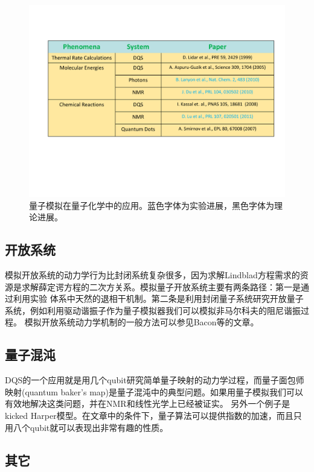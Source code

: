 \begin{figure}[htbp]
            \begin{center}
              \includegraphics[width= 0.8\columnwidth]{figures/simchem.pdf}
              \caption{量子模拟在量子化学中的应用。蓝色字体为实验进展，黑色字体为理论进展。
              }
              \label{simchem}
            \end{center}
\end{figure}

 \subsection{开放系统}

模拟开放系统的动力学行为比封闭系统复杂很多，因为求解Lindblad方程需求的资源是求解薛定谔方程的二次方关系。模拟量子开放系统主要有两条路径：第一是通过利用实验
体系中天然的退相干机制\cite{Lloyd,deco}。第二条是利用封闭量子系统研究开放量子系统，例如利用驱动谐振子作为量子模拟器我们可以模拟非马尔科夫的阻尼谐振过程\cite{open1}。
模拟开放系统动力学机制的一般方法可以参见Bacon等的文章\cite{open2}。

\subsection{量子混沌}

DQS的一个应用就是用几个qubit研究简单量子映射的动力学过程，而量子面包师映射(quantum baker's map)是量子混沌中的典型问题。如果用量子模拟我们可以有效地解决这类问题，并在NMR\cite{chaos2}和线性光学\cite{chaos1}上已经被证实。
另外一个例子是kicked Harper模型\cite{chaos3}。在文章中的条件下，量子算法可以提供指数的加速，而且只用八个qubit就可以表现出非常有趣的性质。

\subsection{其它}

